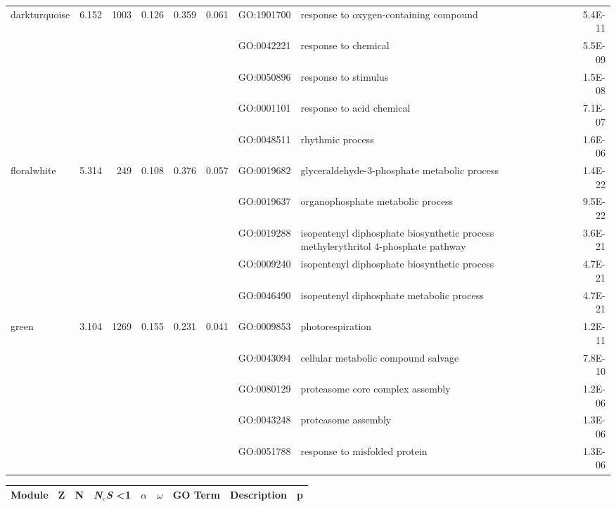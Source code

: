 \begin{landscape}
\begin{table}[ht]
\begin{tabular}{lrrrrrlP{5cm}r}
  darkturquoise & 6.152 & 1003 & 0.126 & 0.359 & 0.061 & GO:1901700 & response to oxygen-containing compound & 5.4E-11 \\ 
   &  &  &  &  &  & GO:0042221 & response to chemical & 5.5E-09 \\ 
   &  &  &  &  &  & GO:0050896 & response to stimulus & 1.5E-08 \\ 
   &  &  &  &  &  & GO:0001101 & response to acid chemical & 7.1E-07 \\ 
   &  &  &  &  &  & GO:0048511 & rhythmic process & 1.6E-06 \\ 
\hline  
floralwhite & 5.314 & 249 & 0.108 & 0.376 & 0.057 & GO:0019682 & glyceraldehyde-3-phosphate metabolic process & 1.4E-22 \\ 
   &  &  &  &  &  & GO:0019637 & organophosphate metabolic process & 9.5E-22 \\ 
   &  &  &  &  &  & GO:0019288 & isopentenyl diphosphate biosynthetic process  methylerythritol 4-phosphate pathway
 & 3.6E-21 \\ 
   &  &  &  &  &  & GO:0009240 & isopentenyl diphosphate biosynthetic process & 4.7E-21 \\ 
   &  &  &  &  &  & GO:0046490 & isopentenyl diphosphate metabolic process & 4.7E-21 \\ 
\hline 
 green & 3.104 & 1269 & 0.155 & 0.231 & 0.041 & GO:0009853 & photorespiration & 1.2E-11 \\ 
   &  &  &  &  &  & GO:0043094 & cellular metabolic compound salvage & 7.8E-10 \\ 
   &  &  &  &  &  & GO:0080129 & proteasome core complex assembly & 1.2E-06 \\ 
   &  &  &  &  &  & GO:0043248 & proteasome assembly & 1.3E-06 \\ 
   &  &  &  &  &  & GO:0051788 & response to misfolded protein & 1.3E-06 \\ 
\hline 

\end{tabular}
\end{table}


\begin{table}[ht]
\centering
\begin{tabular}{lrrrrrlP{5cm}r}
  \hline
Module & Z & N & \textit{N$_{e}$S} \textless 1 & $\alpha$ & $\omega$ & GO Term & Description & p \\ 
  \hline


\end{tabular}
\end{table}
\end{landscape}
